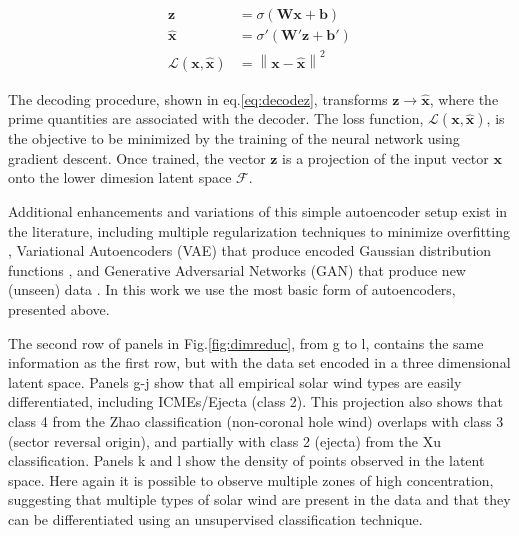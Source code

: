 \begin{align}
\boldsymbol{z} & = \sigma \left( \boldsymbol{W}\boldsymbol{x} + \boldsymbol{b} \right) \label{eq:encodex} \\
\boldsymbol{\hat{x}} & = \sigma' \left( \boldsymbol{W'}\boldsymbol{z} + \boldsymbol{b'} \right) \label{eq:decodez} \\ 
\mathcal{L}(\boldsymbol{x}, \boldsymbol{\hat{x}}) & =  \left\lVert \boldsymbol{x}- \boldsymbol{\hat{x}} \right\rVert^2 \label{eq:aeloss}
\end{align}

The decoding procedure, shown in eq.\eqref{eq:decodez}, transforms $\boldsymbol{z}\rightarrow\boldsymbol{\hat{x}}$, where the prime quantities are associated with the decoder. The loss function, $\mathcal{L}(\boldsymbol{x}, \boldsymbol{\hat{x}})$, is the objective to be minimized by the training of the neural network using gradient descent. Once trained, the vector $\boldsymbol{z}$ is a projection of the input vector $\boldsymbol{x}$ onto the lower dimesion latent space $\boldsymbol{\mathcal{F}}$.

Additional enhancements and variations of this simple autoencoder setup exist in the literature, including multiple regularization techniques to minimize overfitting \citep{7407967}, Variational Autoencoders (VAE) that produce encoded Gaussian distribution functions \citep{Kingma2013}, and Generative Adversarial Networks (GAN) that produce new (unseen) data \citep{Goodfellow2014}. In this work we use the most basic form of autoencoders, presented above.

The second row of panels in Fig.\ref{fig:dimreduc}, from g to l, contains the same information as the first row, but with the data set encoded in a three dimensional latent space. Panels g-j show that all empirical solar wind types are easily differentiated, including ICMEs/Ejecta (class 2). This projection also shows that class 4 from the Zhao classification (non-coronal hole wind) overlaps with class 3 (sector reversal origin), and partially with class 2 (ejecta) from the Xu classification. Panels k and l show the density of points observed in the latent space. Here again it is possible to observe multiple zones of high concentration, suggesting that multiple types of solar wind are present in the data and that they can be differentiated using an unsupervised classification technique.

